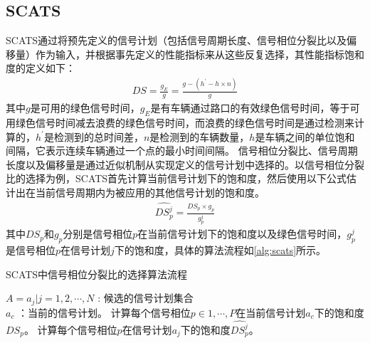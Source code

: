 \subsection{SCATS}
SCATS通过将预先定义的信号计划（包括信号周期长度、信号相位分裂比以及偏移量）作为输入，并根据事先定义的性能指标来从这些反复选择，其性能指标饱和度的定义如下：
\begin{align}
    D S=\frac{g_E}{g}=\frac{g-\left(h^{\prime}-h \times n\right)}{g}
\end{align}
其中$g$是可用的绿色信号时间，$g_E$是有车辆通过路口的有效绿色信号时间，等于可用绿色信号时间减去浪费的绿色信号时间，而浪费的绿色信号时间是通过检测来计算的，$h^{\prime}$是检测到的总时间差，$n$是检测到的车辆数量，$h$是车辆之间的单位饱和间隔，它表示连续车辆通过一个点的最小时间间隔。
信号相位分裂比、信号周期长度以及偏移量是通过近似机制从实现定义的信号计划中选择的。以信号相位分裂比的选择为例，SCATS首先计算当前信号计划下的饱和度，然后使用以下公式估计出在当前信号周期内为被应用的其他信号计划的饱和度。
\begin{align}
    \hat{D S^j_p} = \frac{D S_p \times g_p}{g_p^j}
\end{align}
其中$D S_p\text{和} g_p$分别是信号相位$p$在当前信号计划下的饱和度以及绿色信号时间，$g^j_p$是信号相位$p$在信号计划$j$下的饱和度，具体的算法流程如\autoref{alg:scats}所示。
\begin{breakablealgorithm}
    \caption{SCATS中信号相位分裂比的选择算法流程}
    \label{alg:scats}
    \begin{algorithmic}[1] %
        \Require 
        $A={a_j|j=1,2,\cdots,N}$ : 候选的信号计划集合\\
        $a_c$ ：当前的信号计划。 
            \State 计算每个信号相位$p\in{1,\cdots, P}$在当前信号计划$a_c$下的饱和度$D S_{p}$。
        \EndFor
            \State 计算每个信号相位$p$在信号计划$a_j$下的饱和度$\hat{D S^j_p}$。
        \EndFor
    \end{algorithmic}  
\end{breakablealgorithm}  


